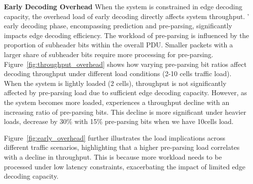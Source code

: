

\textbf{Early Decoding Overhead}
When the system is constrained in edge decoding capacity, the overhead load of early decoding directly affects system throughput. \Name{}' early decoding phase, encompassing prediction and pre-parsing, significantly impacts edge decoding efficiency. The workload of pre-parsing is influenced by the proportion of subheader bits within the overall PDU. Smaller packets with a larger share of subheader bits require more processing for pre-parsing.
Figure~\ref{fig:throughput_overhead} shows how varying pre-parsing bit ratios affect decoding throughput under different load conditions (2-10 cells traffic load). When the system is lightly loaded (2 cells), throughput is not significantly affected by pre-parsing load due to sufficient edge decoding capacity. However, as the system becomes more loaded, \Name{} experiences a throughput decline with an increasing ratio of pre-parsing bits. This decline is more significant under heavier loads, decrease by 30\% with 15\% pre-parsing bits when we have 10cells load.


Figure~\ref{fig:early_overhead} further illustrates the load implications across different traffic scenarios, highlighting that a higher pre-parsing load correlates with a decline in throughput. This is because more workload needs to be processed under low latency constraints, exacerbating the impact of limited edge decoding capacity.





